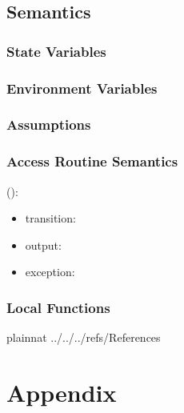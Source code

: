 \documentclass[12pt, titlepage]{article}
\begin{document}
\subsection{Semantics}

\subsubsection{State Variables}



\subsubsection{Environment Variables}


\subsubsection{Assumptions}


\subsubsection{Access Routine Semantics}

\noindent {}():
\begin{itemize}
\item transition:  
\item output:  
\item exception:  
\end{itemize}




\subsubsection{Local Functions}



\newpage

 {plainnat}
 {../../../refs/References}

\newpage

\section{Appendix} \label{Appendix}

\end{document}
